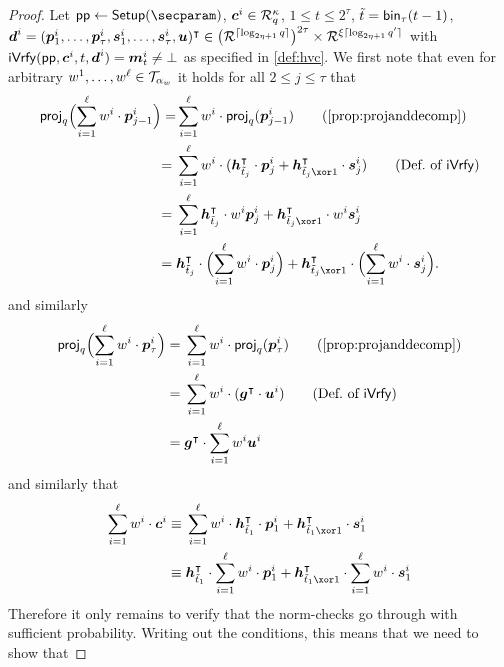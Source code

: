 \begin{proof}
Let $\params \gets \setup(\secparam)$, $\boldsymbol{c}^i \in \mathcal{R}_q^\kappa$,
$1 \leq t \leq 2^\tau$, $\tilde{t} = \mathsf{bin}_{\tau}(t-1)$,
$\boldsymbol{d}^i = (\boldsymbol{p}^i_1,\dots,\boldsymbol{p}^i_{\tau},\boldsymbol{s}^i_1, \dots, \boldsymbol{s}^i_{\tau},\boldsymbol{u})^\intercal \in \bigl(\mathcal{R}^{\lceil\log_{2\eta+1} q\rceil}\bigr)^{2\tau} \times \mathcal{R}^{\xi\lceil\log_{2\eta+1} q'\rceil}$
with $\mathsf{iVrfy}(\mathsf{pp},\boldsymbol{c}^i,t,\boldsymbol{d}^i) = \boldsymbol{m}_t^i \neq \bot$
as specified in \autoref{def:hvc}.
%
We first note that even for arbitrary $w^1,\dots,w^{\ell}\in\mathcal{T}_{\alpha_w}$ it holds for all $2\leq j\leq \tau$ that
\begin{align*}
  \projmod{q}\Bigl(\sum_{i=1}^{\ell}w^i\cdot\vec{p}_{j-1}^i\Bigr) = &\sum_{i=1}^{\ell}w^i\cdot\projmod{q}(\vec{p}_{j-1}^i)\tag{\autoref{prop:projanddecomp}}\\
  ={}&\sum_{i=1}^{\ell}w^i\cdot(\vec{h}_{\tilde t_j}^\transpose\cdot \vec{p}^i_{j} + \vec{h}_{\tilde t_j\xor 1}^\transpose \cdot \vec{s}^i_{j})\tag{Def.\ of $\iverify$}\\
  ={}&\sum_{i=1}^{\ell}\vec{h}_{\tilde t_j}^\transpose\cdot w^i \vec{p}^i_{j} + \vec{h}_{\tilde t_j\xor 1}^\transpose\cdot w^i  \vec{s}^i_{j}\\  
  ={}& \vec{h}_{\tilde t_j}^\transpose\cdot \Bigl(\sum_{i=1}^{\ell}w^i\cdot\vec{p}^i_{j}\Bigr) + \vec{h}_{\tilde t_j \xor 1}^\transpose \cdot \Bigl(\sum_{i=1}^{\ell}w^i\cdot\vec{s}^i_{j}\Bigr).
\end{align*}
and similarly
\begin{align*}
  \projmod{q}\Bigl(\sum_{i=1}^{\ell}w^i\cdot\vec{p}_{\tau}^i\Bigr) ={}&\sum_{i=1}^{\ell}w^i\cdot\projmod{q}(\vec{p}_{\tau}^i)\tag{\autoref{prop:projanddecomp}}\\
  ={}&\sum_{i=1}^{\ell}w^i\cdot(\vec{g}^\transpose\cdot \vec{u}^i)\tag{Def.\ of $\iverify$}\\
  ={}&\vec{g}^\transpose\cdot\sum_{i=1}^{\ell}w^i\vec{u}^i 
\end{align*}
and similarly that 
\begin{align*}
  \sum_{i=1}^{\ell}w^i\cdot \vec{c}^i \equiv{}&\sum_{i=1}^{\ell}w^i\cdot \vec{h}_{\tilde t_1}^\transpose\cdot \vec{p}_{1}^i + \vec{h}_{\tilde t_1 \xor 1}^\transpose \cdot \vec{s}_{1}^i\\
  \equiv{}&\vec{h}_{\tilde t_1}^\transpose\cdot \sum_{i=1}^{\ell}w^i\cdot \vec{p}_{1}^i + \vec{h}_{\tilde t_1 \xor 1}^\transpose \cdot \sum_{i=1}^{\ell}w^i\cdot \vec{s}_{1}^i
\end{align*}
Therefore it only remains to verify that the norm-checks go through with sufficient probability.
Writing out the conditions, this means that we need to show that


\end{proof}
